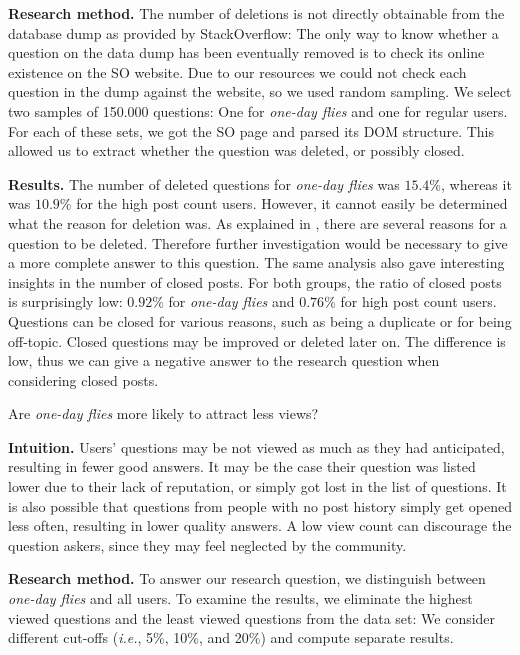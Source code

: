 \documentclass[conference]{IEEEtran}
\newcommand{\ie}{\emph{i.e.},\xspace}
\newcommand\odf{\emph{one-day flies}\xspace}
\newcommand\ru{regular users\xspace}
\begin{document}
\textbf{Research method.} The number of deletions is not directly obtainable
from the database dump as provided by StackOverflow: The only way to know
whether a question on the data dump has been eventually removed is to check its
online existence on the SO website. Due to our resources we could not check
each question in the dump against the website, so we used random sampling. We
select two samples of 150.000 questions: One for \odf and one for \ru.
For each of these sets, we got the SO page and parsed its DOM structure. This
allowed us to extract whether the question was deleted, or possibly closed.

\textbf{Results.} The number of deleted questions for \odf was $15.4\%$,
whereas it was $10.9\%$ for the high post count users. However, it cannot
easily be determined what the reason for deletion was. As explained in
\cite{correa2014chaff}, there are several reasons for a question to be deleted.
Therefore further investigation would be
necessary to give a more complete answer to this question.  The same analysis
also gave interesting insights in the number of closed posts.  For both groups,
the ratio of closed posts is surprisingly low: $0.92\%$ for \odf and $0.76\%$
for high post count users. Questions can be closed for various reasons, such as
being a duplicate or for being off-topic. Closed questions may be improved or
deleted later on. The difference is low, thus we can give a 
negative answer to the research question when considering closed posts.\\ 


\begin{tcolorbox}[size=fbox,title=RQ4: View Count]
Are \odf more likely to attract less views? 
\end{tcolorbox}

\textbf{Intuition.} Users' questions may be not
viewed as much as they had anticipated, resulting in fewer good answers. It may
be the case their question was listed lower due to their lack of reputation, or
simply got lost in the list of questions. It is also possible
that questions from people with no post history simply get opened less often,
resulting in lower quality answers. A low view count can discourage the 
question askers, since they may feel neglected by the community. 
 
\textbf{Research method.} To answer our research question, we distinguish
between \odf and all users. To examine the results,
we eliminate the highest viewed questions and the least
viewed questions  from the data set: We consider different cut-offs
(\ie 5\%, 10\%, and 20\%) and compute separate results. 
 
\end{document}
